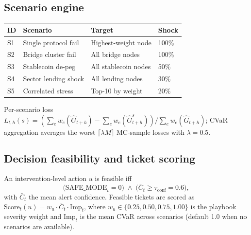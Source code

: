 \subsection{Scenario engine}
\begin{center}\small
\begin{tabular}{@{}llll@{}}
\toprule
ID & Scenario               & Target                 & Shock \\
\midrule
S1 & Single protocol fail   & Highest-weight node    & 100\% \\
S2 & Bridge cluster fail    & All bridge nodes       & 100\% \\
S3 & Stablecoin de-peg      & All stablecoin nodes   & 50\%  \\
S4 & Sector lending shock   & All lending nodes      & 30\%  \\
S5 & Correlated stress      & Top-10 by weight       & 20\%  \\
\bottomrule
\end{tabular}
\end{center}
Per-scenario loss
$L_{t,h}(s)=(\sum_e w_e(\widehat{G}_{t+h})-\sum_e w_e(\widehat{G}_{t+h}^s))/
\sum_e w_e(\widehat{G}_{t+h})$; CVaR aggregation averages the worst
$\lceil \lambda M\rceil$ MC-sample losses with $\lambda\!=\!0.5$.

\subsection{Decision feasibility and ticket scoring}
An intervention-level action $u$ is feasible iff
\begin{equation}
\bigl(\mathrm{SAFE\_MODE}_t\!=\!0\bigr)\;\wedge\;
\bigl(\bar{C}_t\!\geq\!\tau_{\mathrm{conf}}\!=\!0.6\bigr),
\end{equation}
with $\bar{C}_t$ the mean alert confidence. Feasible tickets are
scored as
$\mathrm{Score}_t(u)\!=\!w_u\!\cdot\!\bar{C}_t\!\cdot\!\mathrm{Imp}_t$,
where $w_u\!\in\!\{0.25,0.50,0.75,1.00\}$ is the playbook severity
weight and $\mathrm{Imp}_t$ is the mean CVaR across scenarios
(default 1.0 when no scenarios are available).

